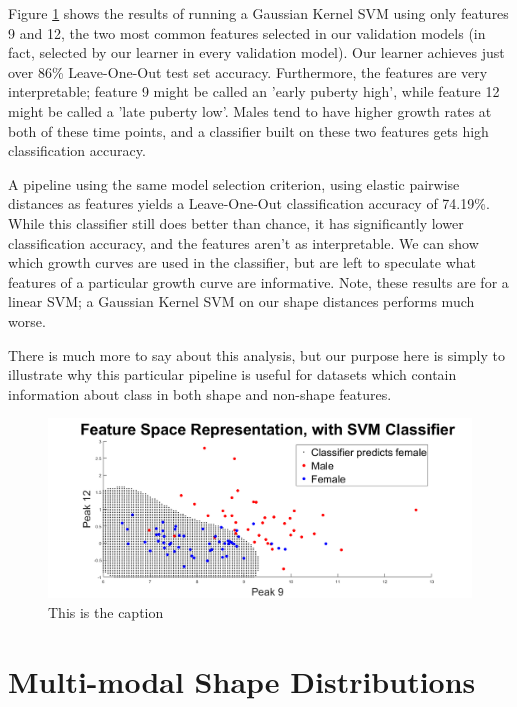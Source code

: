 \documentclass[]{article}
\begin{document}
Figure \ref{EX1: classifier plot} shows the results of running a Gaussian Kernel SVM using only features 9 and 12, the two most common features selected in our validation models (in fact, selected by our learner in every validation model). Our learner achieves just over 86\% Leave-One-Out test set accuracy. Furthermore, the features are very interpretable; feature 9 might be called an 'early puberty high', while feature 12 might be called a 'late puberty low'. Males tend to have higher growth rates at both of these time points, and a classifier built on these two features gets high classification accuracy.

A pipeline using the same model selection criterion, using elastic pairwise distances as features yields a Leave-One-Out classification accuracy of 74.19\%. While this classifier still does better than chance, it has significantly lower classification accuracy, and the features aren't as interpretable. We can show which growth curves are used in the classifier, but are left to speculate what features of a particular growth curve are informative. Note, these results are for a linear SVM; a Gaussian Kernel SVM on our shape distances performs much worse. 

There is much more to say about this analysis, but our purpose here is simply to illustrate why this particular pipeline is useful for datasets which contain information about class in both shape and non-shape features.


\begin{center}
	\begin{figure}
		\includegraphics[width = \linewidth]{./Feature Space.png}
		\caption{This is the caption}
		\label{EX1: classifier plot}
	\end{figure}
\end{center}


\newpage

\section{Multi-modal Shape Distributions}
\end{document}
